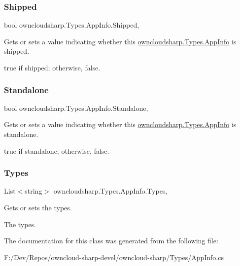 \subsubsection{\texorpdfstring{Shipped}{Shipped}}
{\footnotesize\ttfamily bool owncloudsharp.\+Types.\+App\+Info.\+Shipped\hspace{0.3cm}{\ttfamily [get]}, {\ttfamily [set]}}



Gets or sets a value indicating whether this \hyperlink{classowncloudsharp_1_1_types_1_1_app_info}{owncloudsharp.\+Types.\+App\+Info} is shipped. 

{\ttfamily true} if shipped; otherwise, {\ttfamily false}.\mbox{\label{classowncloudsharp_1_1_types_1_1_app_info_a9094adc94004a3c884d0baede297ddef}} 
\subsubsection{\texorpdfstring{Standalone}{Standalone}}
{\footnotesize\ttfamily bool owncloudsharp.\+Types.\+App\+Info.\+Standalone\hspace{0.3cm}{\ttfamily [get]}, {\ttfamily [set]}}



Gets or sets a value indicating whether this \hyperlink{classowncloudsharp_1_1_types_1_1_app_info}{owncloudsharp.\+Types.\+App\+Info} is standalone. 

{\ttfamily true} if standalone; otherwise, {\ttfamily false}.\mbox{\label{classowncloudsharp_1_1_types_1_1_app_info_a25a28396809e364a14eec89e477f1320}} 
\subsubsection{\texorpdfstring{Types}{Types}}
{\footnotesize\ttfamily List$<$string$>$ owncloudsharp.\+Types.\+App\+Info.\+Types\hspace{0.3cm}{\ttfamily [get]}, {\ttfamily [set]}}



Gets or sets the types. 

The types.

The documentation for this class was generated from the following file\+:\begin{DoxyCompactItemize}
\item 
F\+:/\+Dev/\+Repos/owncloud-\/sharp-\/devel/owncloud-\/sharp/\+Types/App\+Info.\+cs\end{DoxyCompactItemize}
